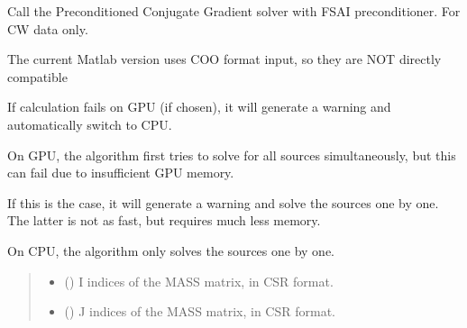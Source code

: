 \documentclass[letterpaper,10pt,english]{sphinxmanual}
\begin{document}
\begin{fulllineitems}
\label{\detokenize{_autosummary/nirfasterff.math.get_field_CW:nirfasterff.math.get_field_CW}}
\pysigstartsignatures
\pysiglinewithargsret
{}
{\sphinxparamcomma {}\sphinxparamcomma {}\sphinxparamcomma {}\sphinxparamcomma {}\sphinxparamcomma {}}
{}
\pysigstopsignatures
\sphinxAtStartPar
Call the Preconditioned Conjugate Gradient solver with FSAI preconditioner. For CW data only.

\sphinxAtStartPar
The current Matlab version uses COO format input, so they are NOT directly compatible

\sphinxAtStartPar
If calculation fails on GPU (if chosen), it will generate a warning and automatically switch to CPU.

\sphinxAtStartPar
On GPU, the algorithm first tries to solve for all sources simultaneously, but this can fail due to insufficient GPU memory.

\sphinxAtStartPar
If this is the case, it will generate a warning and solve the sources one by one. The latter is not as fast, but requires much less memory.

\sphinxAtStartPar
On CPU, the algorithm only solves the sources one by one.
\begin{quote}\begin{description}
\begin{itemize}
\item {} 
\sphinxAtStartPar
{} (\sphinxstyleliteralemphasis{\sphinxupquote{, }}) \textendash{} I indices of the MASS matrix, in CSR format.

\item {} 
\sphinxAtStartPar
{} (\sphinxstyleliteralemphasis{\sphinxupquote{, }}) \textendash{} J indices of the MASS matrix, in CSR format.


\end{itemize}
\end{description}
\end{quote}
\end{fulllineitems}
\end{document}
